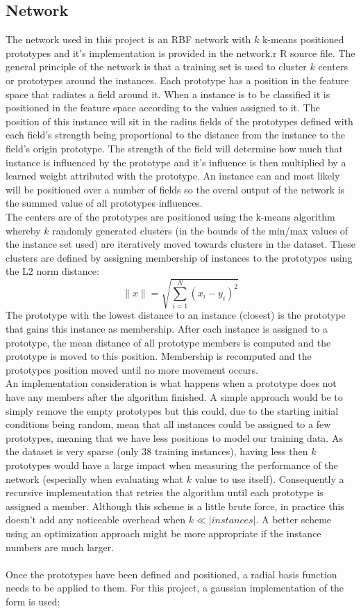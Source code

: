 \documentclass[twocolumn]{article}
\begin{document}
\subsection{Network}
The network used in this project is an RBF network with $k$ k-means positioned prototypes and it's implementation is provided in the network.r R source file. 
The general principle of the network is that a training set is used to cluster $k$ centers or prototypes around the instances. Each prototype
has a position in the feature space that radiates a field around it. When a instance is to be classified it is positioned in the feature space according
to the values assigned to it. The position of this instance will sit in the radius fields of the prototypes defined with each field's strength being
proportional to the distance from the instance to the field's origin prototype. The strength of the field will determine how much that instance is
influenced by the prototype and it's influence is then multiplied by a learned weight attributed with the prototype. An instance can and most likely 
will be positioned over a number of fields so the overal output of the network is the summed value of all prototypes influences.\\
The centers are of the prototypes are positioned using the k-means algorithm whereby $k$ randomly generated clusters (in the bounds of the min/max 
values of the instance set used) are iteratively moved towards clusters in the dataset. These clusters are defined by assigning 
membership of instances to the prototypes using the L2 norm distance:
\[
\|x\| = \sqrt{\sum_{i=1}^{N}(x_i - y_i)^2}
\]
The prototype with the lowest distance to an instance (closest) is the prototype that gains this instance as membership. After each instance
is assigned to a prototype, the mean distance of all prototype members is computed and the prototype is moved to this position. Membership is
recomputed and the prototypes position moved until no more movement occurs. \\
An implementation consideration is what happens when a prototype does not have any members after the algorithm finished. A simple approach would
be to simply remove the empty prototypes but this could, due to the starting initial conditions being random, mean that all instances could be
assigned to a few prototypes, meaning that we have less positions to model our training data. As the dataset is very sparse (only 38 training
instances), having less then $k$ prototypes would have a large impact when measuring the performance of the network (especially when evaluating what
$k$ value to use itself). Consequently a recursive implementation that retries the algorithm until each prototype is assigned a member. Although this
scheme is a little brute force, in practice this doesn't add any noticeable overhead when $k\ll|instances|$. A better scheme using an optimization
approach might be more appropriate if the instance numbers are much larger.\\
\\
Once the prototypes have been defined and positioned, a radial basis function needs to be applied to them. For this project, a gaussian implementation
of the form is used:
\end{document}
